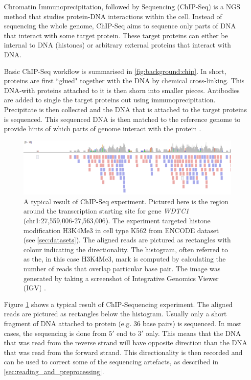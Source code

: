 \documentclass[parskip]{cs4rep}
\newcommand{\histonemodification}[1]{#1}
\newcommand{\celltype}[1]{#1}
\begin{document}
Chromatin Immunoprecipitation, followed by Sequencing (ChIP-Seq) is a NGS method that studies protein-DNA interactions within the cell. Instead of sequencing the whole genome, ChIP-Seq aims to sequence only parts of DNA that interact with some target protein. These target proteins can either be internal to DNA (histones) or arbitrary external proteins that interact with DNA.

Basic ChIP-Seq workflow is summarised in \autoref{fig:background:chip}. In short, proteins are first ``glued" together with the DNA by chemical cross-linking. This DNA-with proteins attached to it is then shorn into smaller pieces. Antibodies are added to single the target proteins out using immunoprecipitation. Precipitate is then collected and the DNA that is attached to the target proteins is sequenced. This sequenced DNA is then matched to the reference genome to provide hints of which parts of genome interact with the protein \cite{Mardis:2007wa}.

\begin{figure}[t]
    \centering
    \includegraphics[width=\textwidth]{figures/background/igv_panel_screenshot_k562_h3k4me3_WDTC1-transparentbcg.png}
    \caption{A typical result of ChIP-Seq experiment. Pictured here is the region around the transcription starting site for gene \emph{WDTC1} (chr1:27,559,006-27,563,006). The experiment targeted histone modification \histonemodification{H3K4Me3} in cell type \celltype{K562} from ENCODE dataset (see \autoref{sec:datasets}). The aligned reads are pictured as rectangles with colour indicating the directionality. The histogram, often referred to as the, in this case \histonemodification{H3K4Me3}, mark is computed by calculating the number of reads that overlap particular base pair. The image was generated by taking a screenshot of Integrative Genomics Viewer (IGV) \cite{Thorvaldsdottir:2012wy}.}
    \label{fig:background:chip-results}
\end{figure}

Figure \ref{fig:background:chip-results} shows a typical result of ChIP-Sequencing experiment.
The aligned reads are pictured as rectangles below the histogram. Usually only a short fragment of DNA attached to protein (e.g. 36 base pairs) is sequenced. In most cases, the sequencing is done from $5'$ end to $3'$ only\cite{Park:2009wc}. This means that the DNA that was read from the reverse strand will have opposite direction than the DNA that was read from the forward strand. This directionality is then recorded and can be used to correct some of the sequencing artefacts, as described in \autoref{sec:reading_and_preprocessing}.
\end{document}
